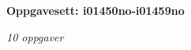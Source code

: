 \centerline{\bf Oppgavesett: i01450no-i01459no}
\vskip 10pt
\centerline{\it 10 oppgaver}\vskip 10pt
\vskip 10pt
